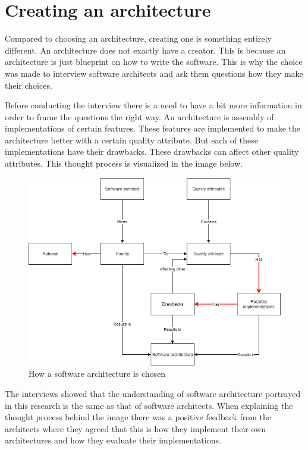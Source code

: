 \section{Creating an architecture}

Compared to choosing an architecture, creating one is something entirely different. An architecture does not exactly have a creator. This is because an architecture is just blueprint on how to write the software. This is why the choice was made to interview software architects and ask them questions how they make their choices.

Before conducting the interview there is a need to have a bit more information in order to frame the questions the right way. An architecture is assembly of implementations of certain features. These features are implemented to make the architecture better with a certain quality attribute. But each of these implementations have their drawbacks. These drawbacks can affect other quality attributes. This thought process is visualized in the image below.

\begin{figure}[H]
	\includegraphics[width=\linewidth]{creating_architecture.png}
	\caption{How a software architecture is chosen}
\end{figure}

The interviews showed that the understanding of software architecture portrayed in this research is the same as that of software architects. When explaining the thought process behind the image there was a positive feedback from the architects where they agreed that this is how they implement their own architectures and how they evaluate their implementations.
